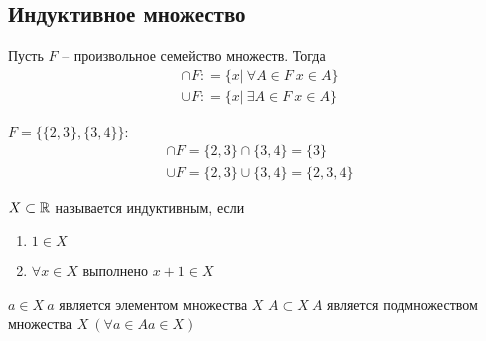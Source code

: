 \subsection{Индуктивное множество}
\begin{definition} \label{definition_F}
    Пусть $ F $ -- произвольное семейство множеств. Тогда \begin{gather}
        \cap F : = \{x|\ \forall A \in F\ x \in A\} \\
        \cup F : = \{x |\ \exists A \in F\ x \in A\}
    \end{gather} 
\end{definition}
\begin{example}
    $ F = \{\{2, 3\}, \{3, 4\}\} $: \begin{gather}
        \cap F = \{2, 3\}\cap\{3, 4\} = \{3\} \\
        \cup F = \{2, 3\}\cup \{3, 4\} = \{2, 3, 4\} 
    \end{gather}
\end{example}
\begin{definition}
    $ X \subset \mathbb{R} $ называется индуктивным, если \begin{enumerate}
        \item $ 1 \in  X $ 
        \item $ \forall  x \in X $ выполнено $ x + 1 \in X $
    \end{enumerate}
\end{definition}
\begin{note}
    $ a \in X \ a $ является элементом множества $ X $
 $ A \subset X \ A $ является подмножеством множества $ X\ (\forall a \in  A a \in  X) $
\end{note}
